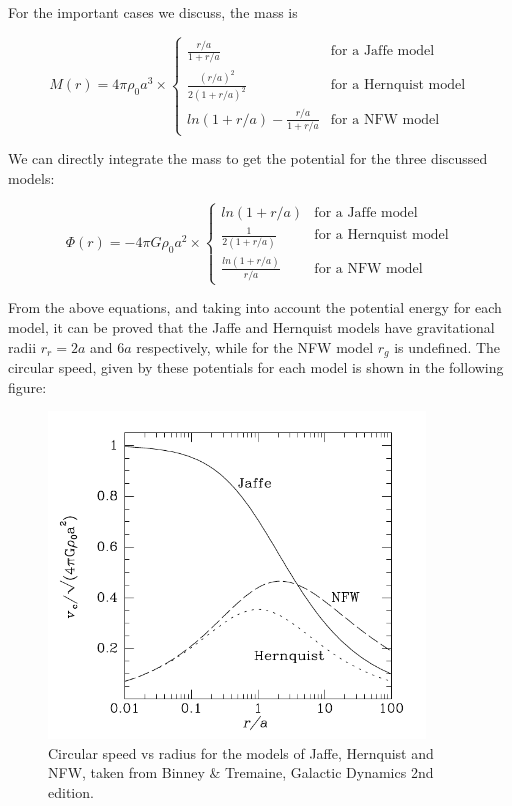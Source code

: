 For the important cases we discuss, the mass is

\begin{equation}
M(r) = 4\pi \rho_{0}a^{3} \times \left\lbrace
\begin{array}{lll}
\frac{r/a}{1+r/a} & \text{for a Jaffe model}\\
\frac{(r/a)^{2}}{2(1+r/a)^{2}} & \text{for a Hernquist model}\\
ln(1+r/a)-\frac{r/a}{1+r/a} & \text{for a NFW model}
\end{array}
\right.
\end{equation} 

We can directly integrate the mass to get the potential for the three discussed models:

\begin{equation}
\Phi(r) = -4\pi G\rho_{0}a^{2} \times \left\lbrace
\begin{array}{lll}
ln(1+r/a) & \text{for a Jaffe model}\\
\frac{1}{2(1+r/a)} & \text{for a Hernquist model}\\
\frac{ln(1+r/a)}{r/a} & \text{for a NFW model}
\end{array}
\right.
\end{equation} 

From the above equations, and taking into account the potential energy for each model, it can be proved that the Jaffe and Hernquist models have gravitational radii $r_{r}=2a$ and $6a$ respectively, while for the NFW model $r_{g}$ is undefined. The circular speed, given by these potentials for each model is shown in the following figure: 

\begin{figure}[H]
\centering
\includegraphics[width=10cm]{images/circular_velocity_vs_radius.png}
\caption[Circular speed vs radius for the Jaffe, Hernquist, and NFW models]{Circular speed vs radius for the models of Jaffe, Hernquist and NFW, taken from Binney \& Tremaine, Galactic Dynamics 2nd edition.}
\end{figure}

